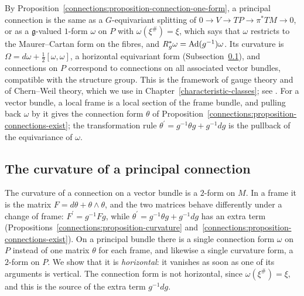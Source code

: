 \begin{remark}\label{connections:remark-principal-connections}
By Proposition~\ref{connections:proposition-connection-one-form}, a principal connection is the same as a $G$-equivariant splitting of
$0 \to V \to TP \to \pi^*TM \to 0$, or as a $\mathfrak{g}$-valued $1$-form $\omega$ on $P$ with $\omega(\xi^\#) = \xi$, which says that $\omega$ restricts to the Maurer--Cartan form on the fibres,
and $R_g^*\omega = \operatorname{Ad}(g^{-1})\omega$. Its curvature is $\Omega = d\omega + \frac12[\omega, \omega]$, a horizontal equivariant form (Subsection~\ref{connections:subsection-principal-curvature}), and connections on $P$ correspond to connections on all
associated vector bundles, compatible with the structure group. This is the framework of gauge theory and of Chern--Weil theory, which we use in Chapter~\ref{characteristic-classes}; see
\cite[Chapters I--II]{kobayashi-nomizu}. For a vector bundle, a local frame is a local section of the frame bundle, and pulling back $\omega$ by it gives the connection form
$\theta$ of Proposition~\ref{connections:proposition-connections-exist}; the transformation rule $\theta^{\prime} = g^{-1}\theta g + g^{-1}dg$ is the pullback of the equivariance of
$\omega$.
\end{remark}

\subsection{The curvature of a principal connection}\label{connections:subsection-principal-curvature}

The curvature of a connection on a vector bundle is a $2$-form on $M$. In a frame it is the matrix $F = d\theta + \theta \wedge \theta$, and the two matrices behave differently under a change of
frame: $F^{\prime} = g^{-1}Fg$, while $\theta^{\prime} = g^{-1}\theta g + g^{-1}dg$ has an extra term (Propositions~\ref{connections:proposition-curvature}
and~\ref{connections:proposition-connections-exist}). On a principal bundle there is a single connection form $\omega$ on $P$ instead of one matrix $\theta$ for each frame, and likewise a single
curvature form, a $2$-form on $P$. We show that it is \emph{horizontal}: it vanishes as soon as one of its arguments is vertical. The connection form is not horizontal, since $\omega(\xi^\#) = \xi$, and
this is the source of the extra term $g^{-1}dg$.

